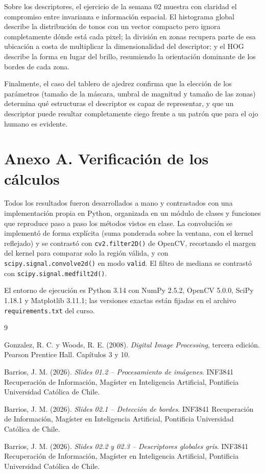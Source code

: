\documentclass[12pt, a4paper]{article}
\begin{document}
Sobre los descriptores, el ejercicio de la semana 02 muestra con claridad el compromiso entre invarianza e información espacial. El histograma global describe la distribución de tonos con un vector compacto pero ignora completamente dónde está cada pixel; la división en zonas recupera parte de esa ubicación a costa de multiplicar la dimensionalidad del descriptor; y el HOG describe la forma en lugar del brillo, resumiendo la orientación dominante de los bordes de cada zona.

Finalmente, el caso del tablero de ajedrez confirma que la elección de los parámetros (tamaño de la máscara, umbral de magnitud y tamaño de las zonas) determina qué estructuras el descriptor es capaz de representar, y que un descriptor puede resultar completamente ciego frente a un patrón que para el ojo humano es evidente.

\section*{Anexo A. Verificación de los cálculos}

Todos los resultados fueron desarrollados a mano y contrastados con una implementación propia en Python, organizada en un módulo de clases y funciones que reproduce paso a paso los métodos vistos en clase. La convolución se implementó de forma explícita (suma ponderada sobre la ventana, con el kernel reflejado) y se contrastó con \texttt{cv2.filter2D()} de OpenCV, recortando el margen del kernel para comparar solo la región válida, y con \texttt{scipy.signal.convolve2d()} en modo \texttt{valid}. El filtro de mediana se contrastó con \texttt{scipy.signal.medfilt2d()}.

El entorno de ejecución es Python 3.14 con NumPy 2.5.2, OpenCV 5.0.0, SciPy 1.18.1 y Matplotlib 3.11.1; las versiones exactas están fijadas en el archivo \texttt{requirements.txt} del curso.

\begin{thebibliography}{9}

Gonzalez, R. C. y Woods, R. E. (2008). \textit{Digital Image Processing}, tercera edición. Pearson Prentice Hall. Capítulos 3 y 10.

Barrios, J. M. (2026). \textit{Slides 01.2 -- Procesamiento de imágenes}. INF3841 Recuperación de Información, Magíster en Inteligencia Artificial, Pontificia Universidad Católica de Chile.

Barrios, J. M. (2026). \textit{Slides 02.1 -- Detección de bordes}. INF3841 Recuperación de Información, Magíster en Inteligencia Artificial, Pontificia Universidad Católica de Chile.

Barrios, J. M. (2026). \textit{Slides 02.2 y 02.3 -- Descriptores globales gris}. INF3841 Recuperación de Información, Magíster en Inteligencia Artificial, Pontificia Universidad Católica de Chile.

\end{thebibliography}
\end{document}
